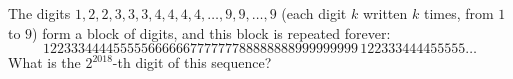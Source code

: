 The digits $1,2,2,3,3,3,4,4,4,4,\dots,9,9,\dots,9$ (each digit $k$ written $k$ times, from $1$ to $9$) form a block of digits, and this block is repeated forever:
\[
122333444455555666666777777788888888999999999\,122333444455555\dots
\]
What is the $2^{2018}$-th digit of this sequence?

